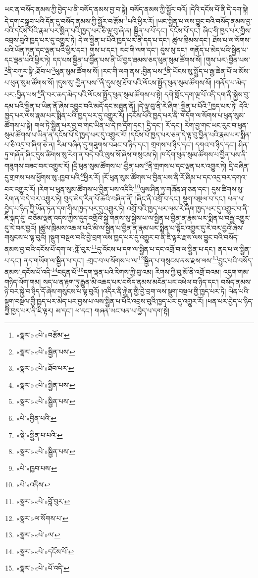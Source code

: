 ཡང་ན་བསོད་ནམས་ཀྱི་བྱེད་པ་ནི་བསོད་ནམས་བྱ་བ་སྟེ། བསོད་ནམས་ཀྱི་སྦྱོར་བའོ། །དེའི་དངོས་པོ་ནི་དེ་དག་སྟེ། དེ་དག་བསྒྲུབ་པའི་དོན་དུ་བསོད་ནམས་ཀྱི་སྦྱོར་བ་རྩོམ་\footnote{«སྣར་»«པེ་»བརྩོམ་}པའི་ཕྱིར་རོ། །ཡང་སྦྱིན་པ་ལས་བྱུང་བའི་བསོད་ནམས་བྱ་བའི་དངོས་པོའི་རྣམ་པར་སྨིན་པའི་ཁྱད་པར་ཅི་ལྟ་བུ་ཞེ་ན། སྦྱིན་པ་པོ་དང་། དངོས་པོ་དང་། ཞིང་གི་ཁྱད་པར་གྱིས་འབྲས་བུའི་ཁྱད་པར་དུ་འགྱུར་ཏེ། དེ་ལ་སྦྱིན་པ་པོའི་ཁྱད་པར་ནི་དད་པ་དང་། ཚུལ་ཁྲིམས་དང་། ཐོས་པ་ལ་སོགས་པའི་ཡོན་ཏན་དང་ལྡན་པའི་ཕྱིར་དང་། གུས་པ་དང་། རང་གི་ལག་དང་། དུས་སུ་དང་། གནོད་པ་མེད་པའི་སྦྱིན་པ་དང་ལྡན་པའི་ཕྱིར་ཏེ། དད་པས་སྦྱིན་པ་བྱིན་པས་ནི་ཡོ་བྱད་ཐམས་ཅད་ཕུན་སུམ་ཚོགས་སོ། །གུས་པར་:བྱིན་པས་\footnote{«སྣར་»«པེ་»སྦྱིན་པས་}ནི་བཀུར་སྟི་:ཐོབ་པ་\footnote{«སྣར་»«པེ་»ཐོབ་པར་}ཕུན་སུམ་ཚོགས་སོ། །རང་གི་ལག་ནས་:བྱིན་པས་\footnote{«སྣར་»«པེ་»སྦྱིན་པས་}ནི་ཡོངས་སུ་སྤྱོད་པ་རྒྱ་ཆེན་པོ་ལ་མོས་པ་ཕུན་སུམ་ཚོགས་སོ། །དུས་སུ་:བྱིན་པས་\footnote{«སྣར་»«པེ་»སྦྱིན་པས་}ནི་དུས་སུ་ཐོབ་པའི་ལོངས་སྤྱོད་ཕུན་སུམ་ཚོགས་སོ། །གནོད་པ་མེད་པར་:བྱིན་པས་\footnote{«པེ་»བྱིན་པའི་}ནི་བར་ཆད་མེད་པའི་ལོངས་སྤྱོད་ཕུན་སུམ་ཚོགས་པ་སྟེ། དགེ་སློང་དག་ལྔ་པོ་འདི་དག་ནི་སྐྱེས་བུ་དམ་པའི་སྦྱིན་པ་ཡིན་ནོ་ཞེས་འབྱུང་བའི་མདོ་དང་མཐུན་ནོ། །དེ་ལྟ་བུ་ནི་རེ་ཞིག་:སྦྱིན་པ་པོའི་\footnote{«སྡེ་»སྦྱིན་པ་པའི་}ཁྱད་པར་ཏེ། དེའི་ཁྱད་པར་ལས་རྣམ་པར་སྨིན་པའི་ཁྱད་པར་དུ་འགྱུར་རོ། །དངོས་པོའི་ཁྱད་པར་ནི་ཁ་དོག་ལ་སོགས་པ་ཕུན་སུམ་ཚོགས་པ་སྟེ། གལ་ཏེ་སྦྱིན་པར་བྱ་བ་གང་ཡིན་པ་དེ་ཁ་དོག་དང་། དྲི་དང་། རོ་དང་། རེག་བྱ་གང་ཡང་རུང་བ་ཕུན་སུམ་ཚོགས་པ་ཡིན་ན་དངོས་པོ་དེ་ཁྱད་པར་དུ་འགྱུར་རོ། །དངོས་པོ་ཁྱད་པར་ཅན་དེ་ལྟ་བུ་བྱིན་པའི་རྣམ་པར་སྨིན་པ་ཅི་འདྲ་བ་ཞིག་ཅེ་ན། རིམ་བཞིན་དུ་གཟུགས་བཟང་བ་ཉིད་དང་། གྲགས་པ་ཉིད་དང་། དགའ་བ་ཉིད་དང་། ཤིན་ཏུ་གཞོན་ཞིང་དུས་ཚིགས་སུ་རེག་ན་བདེ་བའི་ལུས་སོ་ཞེས་གསུངས་ཏེ། ཁ་དོག་ཕུན་སུམ་ཚོགས་པ་བྱིན་པས་ནི་གཟུགས་བཟང་བར་འགྱུར་རོ། །དྲི་ཕུན་སུམ་ཚོགས་པ་:བྱིན་པས་\footnote{«སྣར་»«པེ་»སྦྱིན་པས་}ནི་གྲགས་པ་དང་ལྡན་པར་འགྱུར་ཏེ། དྲི་བཞིན་དུ་གྲགས་པས་ཕྱོགས་སུ་:ཁྱབ་པའི་\footnote{«པེ་»ཁྱབ་པས་}ཕྱིར་རོ། །རོ་ཕུན་སུམ་ཚོགས་པ་བྱིན་པས་ནི་རོ་ཞིམ་པ་དང་འདྲ་བར་དགའ་བར་འགྱུར་རོ། །རེག་པ་ཕུན་སུམ་ཚོགས་པ་བྱིན་པས་འདིའི་\footnote{«པེ་»འདིས་}ལུས་ཤིན་ཏུ་གཞོན་ཤ་ཅན་དང་། དུས་ཚིགས་སུ་རེག་ན་བདེ་བར་འགྱུར་ཏེ། བུད་མེད་རིན་པོ་ཆེའི་བཞིན་ནོ། །ཞིང་ནི་འགྲོ་བ་དང་། སྡུག་བསྔལ་བ་དང་། ཕན་པ་བྱེད་པ་ཉིད་ཀྱི་ཡོན་ཏན་དག་གིས་ཁྱད་པར་དུ་འགྱུར་ཏེ། འགྲོ་བའི་ཁྱད་པར་ལས་རེ་ཞིག་ཁྱད་པར་དུ་འགྱུར་བ་ནི་ཇི་སྐད་དུ། བཅོམ་ལྡན་འདས་ཀྱིས་དུད་འགྲོའི་སྐྱེ་གནས་སུ་སྐྱེས་པ་ལ་སྦྱིན་པ་བྱིན་ན་རྣམ་པར་སྨིན་པ་བརྒྱ་འགྱུར་དུ་རེ་བར་བྱའོ། །ཚུལ་ཁྲིམས་འཆལ་པའི་མི་ལ་སྦྱིན་པ་བྱིན་ན་རྣམ་པར་སྨིན་པ་སྟོང་འགྱུར་དུ་རེ་བར་བྱའོ་ཞེས་གསུངས་པ་ལྟ་བུའོ། །སྡུག་བསྔལ་བའི་བྱེ་བྲག་ལས་ཁྱད་པར་དུ་འགྱུར་བ་ནི་ཇི་ལྟར་རྫས་ལས་བྱུང་བའི་བསོད་ནམས་བྱ་བའི་དངོས་པོ་དག་ལ་:གློ་བུར་\footnote{«སྣར་»«པེ་»བློ་བུར་}དུ་འོངས་པ་དག་ལ་སྦྱིན་པ་དང་འགྲོ་བ་ལ་སྦྱིན་པ་དང་། ནད་པ་ལ་སྦྱིན་པ་དང་། ནད་གཡོག་ལ་སྦྱིན་པ་དང་། :གྲང་བ་ལ་སོགས་པ་ལ་\footnote{«སྣར་»ལ་སོགས་པ་}སྦྱིན་པ་གསུངས་ནས་རྫས་ལས་\footnote{«སྣར་»«པེ་»ལ་}བྱུང་པའི་བསོད་ནམས་:དངོས་པོ་འདི་\footnote{«སྣར་»«པེ་»དངོས་པོ་}བདུན་པོ་\footnote{«སྣར་»«པེ་»པོ་འདི་}དག་ལྡན་པའི་རིགས་ཀྱི་བུ་འམ། རིགས་ཀྱི་བུ་མོ་ནི་འགྲོ་བའམ། འདུག་གམ་གཉིད་ལོག་གམ། སད་པ་ན་རྟག་ཏུ་རྒྱུན་མི་འཆད་པར་བསོད་ནམས་མངོན་པར་འཕེལ་བ་ཉིད་དང་། བསོད་ནམས་ཉེ་བར་སྐྱེ་བ་ཉིད་དོ་ཞེས་གསུངས་པ་ལྟ་བུའོ། །འདིར་ནི་རྐྱེན་གྱི་བྱེ་བྲག་ལས་སྡུག་བསྔལ་གྱི་ཁྱད་པར་ཏེ། ལེན་པའི་སྡུག་བསྔལ་གྱི་ཁྱད་པར་མེད་པར་བྱས་པ་ལས་སྦྱིན་པ་པོའི་འབྲས་བུའི་ཁྱད་པར་དུ་འགྱུར་རོ། །ཕན་པར་བྱེད་པ་ཉིད་ཀྱི་ཁྱད་པར་ནི་ཇི་ལྟར། མ་དང་། ཕ་དང་། གཞན་ཡང་ཕན་པ་བྱེད་པ་དག་སྟེ། 